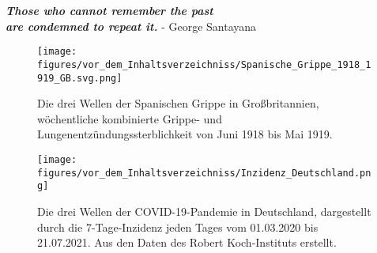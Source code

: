 \vspace*{20pt}
\begin{center}
    \huge{\textbf{
    \textit{Those who cannot remember the past\\ are condemned to repeat it.}}}
    \large{- George Santayana \autocite{history-quoteSantayana}}
\end{center}
\vspace*{50pt}
\begin{figure}[h]
    \centering
    \texttt{[image: figures/vor\_dem\_Inhaltsverzeichniss/Spanische\_Grippe\_1918\_1919\_GB.svg.png]}
    \caption{Die drei Wellen der \glqq{}Spanischen Grippe\grqq{} in Großbritannien, wöchentliche kombinierte Grippe- und Lungenentzündungssterblichkeit von Juni 1918 bis Mai 1919. \autocite{spanischflu}}
    \label{fig:spanishflu}
\end{figure}
\vspace*{10pt}
\begin{figure}[h]
    \centering
    \texttt{[image: figures/vor\_dem\_Inhaltsverzeichniss/Inzidenz\_Deutschland.png]}
    \caption{Die drei Wellen der COVID-19-Pandemie in Deutschland, dargestellt durch die 7-Tage-Inzidenz jeden Tages vom 01.03.2020 bis 21.07.2021. Aus den Daten des Robert Koch-Instituts erstellt.}
    \label{fig:germany_incidence}
\end{figure}